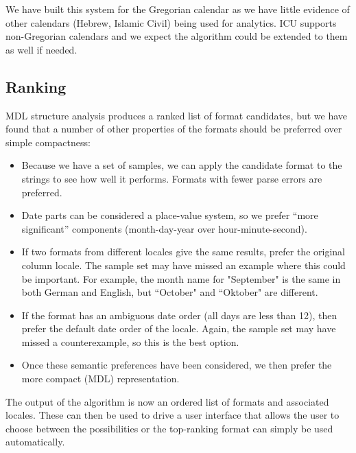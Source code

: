 We have built this system for the Gregorian calendar as we have little evidence of other calendars (\eg Hebrew, Islamic Civil) being used for analytics. 
ICU supports non-Gregorian calendars and we expect the algorithm could be extended to them as well if needed.

\subsection{Ranking}
MDL structure analysis produces a ranked list of format candidates, but we have found that a number of other properties of the formats should be preferred over simple compactness:
\begin{itemize}
\setlength\itemsep{0em}
\item Because we have a set of samples, we can apply the candidate format to the strings to see how well it performs. Formats with fewer parse errors are preferred.
\item Date parts can be considered a place-value system, so we prefer ``more significant'' components (\eg month-day-year over hour-minute-second).
\item If two formats from different locales give the same results, prefer the original column locale. The sample set may have missed an example where this could be important. For example, the month name for "September" is the same in both German and English, but ``October" and ``Oktober" are different.
\item If the format has an ambiguous date order (\eg all days are less than 12), then prefer the default date order of the locale. Again, the sample set may have missed a counterexample, so this is the best option.
\item Once these semantic preferences have been considered, we then prefer the more compact (MDL) representation.
\end{itemize}

The output of the algorithm is now an ordered list of formats and associated locales. These can then be used to drive a user interface that allows the user to choose between the possibilities or the top-ranking format can simply be used automatically.
